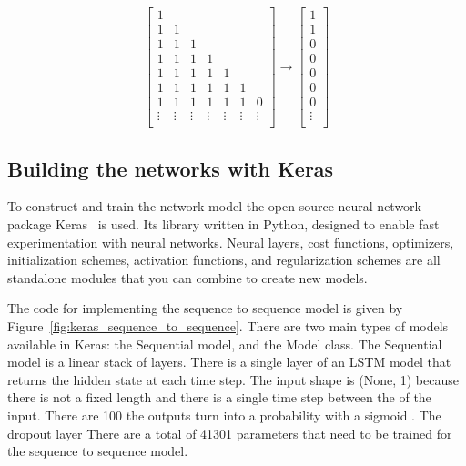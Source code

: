 \begin{equation}
    \begin{bmatrix}
        1 &  &  \\
        1 & 1 &  \\
        1 & 1 & 1 \\
        1 & 1 & 1 & 1 \\
        1 & 1 & 1 & 1 & 1 \\
        1 & 1 & 1 & 1 & 1 & 1\\
        1 & 1 & 1 & 1 & 1 & 1 & 0 \\
        \vdots & \vdots & \vdots & \vdots & \vdots & \vdots & \vdots \\
    \end{bmatrix} \to 
    \begin{bmatrix}
        1 \\
        1 \\
        0 \\
        0 \\
        0 \\
        0 \\
        0 \\
        \vdots \\
    \end{bmatrix}
\end{equation}

\subsection{Building the networks with Keras}

To construct and train the network model the open-source neural-network package
Keras~\cite{Chollet2015} is used. Its library written in Python, designed to
enable fast experimentation with neural networks.
Neural layers, cost functions, optimizers, initialization schemes, activation
functions, and regularization schemes are all standalone modules that you can
combine to create new models.

The code for implementing the sequence to sequence model is given by
Figure~\ref{fig:keras_sequence_to_sequence}. There are two main types of models
available in Keras: the Sequential model, and the Model class. The Sequential
model is a linear stack of layers. There is a single layer of an LSTM model that
returns the hidden state at each time step. The input shape is (None, 1) because
there is not a fixed length and there is a single time step between the of the
input. There are 100 the outputs turn into a probability with a sigmoid . The
dropout layer 
There are a total of 41301 parameters that need to be trained for the sequence
to sequence model.

